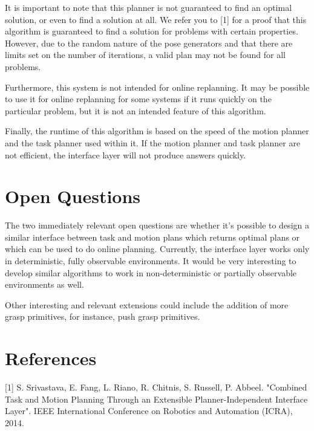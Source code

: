 \documentclass[12pt]{article}
\begin{document}
It is important to note that this planner is not guaranteed to find an optimal solution, or even to find a solution at all.  
We refer you to [1] for a proof that this algorithm is guaranteed to find a solution for problems with certain properties.  
However, due to the random nature of the pose generators and that there are limits set on the number of iterations, a valid plan may not be found for all problems.  

Furthermore, this system is not intended for online replanning.  
It may be possible to use it for online replanning for some systems if it runs quickly on the particular problem, but it is not an intended feature of this algorithm.

Finally, the runtime of this algorithm is based on the speed of the motion planner and the task planner used within it.  
If the motion planner and task planner are not efficient, the interface layer will not produce answers quickly.

\section{Open Questions}

The two immediately relevant open questions are whether it's possible to design a similar interface between task and motion plans which returns optimal plans or which can be used to do online planning.
Currently, the interface layer works only in deterministic, fully observable environments.  
It would be very interesting to develop similar algorithms to work in non-deterministic or partially observable environments as well.

Other interesting and relevant extensions could include the addition of more grasp primitives, for instance, push grasp primitives.




\section{References}

[1] S. Srivastava, E. Fang, L. Riano, R. Chitnis, S. Russell, P. Abbeel. "Combined Task and Motion Planning Through an Extensible Planner-Independent Interface Layer". IEEE International Conference on Robotics and Automation (ICRA), 2014.
\end{document}
